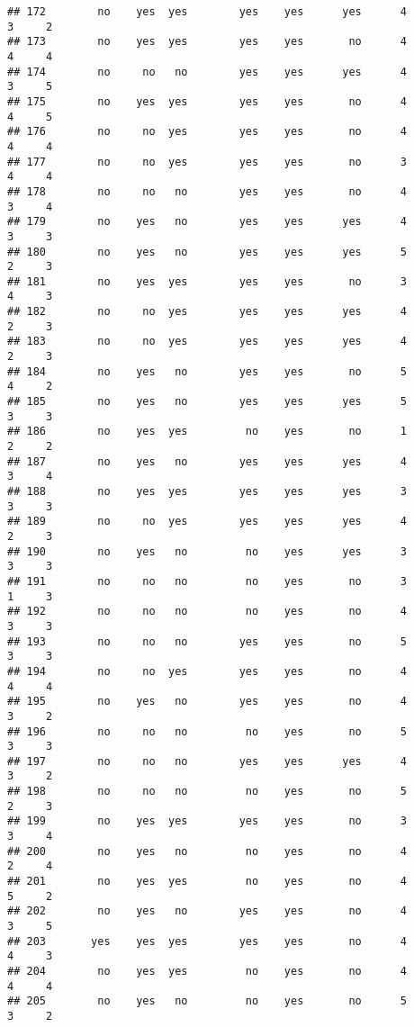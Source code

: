 \documentclass[]{article}
\begin{document}
\begin{verbatim}
## 172        no    yes  yes        yes    yes      yes      4        3     2
## 173        no    yes  yes        yes    yes       no      4        4     4
## 174        no     no   no        yes    yes      yes      4        3     5
## 175        no    yes  yes        yes    yes       no      4        4     5
## 176        no     no  yes        yes    yes       no      4        4     4
## 177        no     no  yes        yes    yes       no      3        4     4
## 178        no     no   no        yes    yes       no      4        3     4
## 179        no    yes   no        yes    yes      yes      4        3     3
## 180        no    yes   no        yes    yes      yes      5        2     3
## 181        no    yes  yes        yes    yes       no      3        4     3
## 182        no     no  yes        yes    yes      yes      4        2     3
## 183        no     no  yes        yes    yes      yes      4        2     3
## 184        no    yes   no        yes    yes       no      5        4     2
## 185        no    yes   no        yes    yes      yes      5        3     3
## 186        no    yes  yes         no    yes       no      1        2     2
## 187        no    yes   no        yes    yes      yes      4        3     4
## 188        no    yes  yes        yes    yes      yes      3        3     3
## 189        no     no  yes        yes    yes      yes      4        2     3
## 190        no    yes   no         no    yes      yes      3        3     3
## 191        no     no   no         no    yes       no      3        1     3
## 192        no     no   no         no    yes       no      4        3     3
## 193        no     no   no        yes    yes       no      5        3     3
## 194        no     no  yes        yes    yes       no      4        4     4
## 195        no    yes   no        yes    yes       no      4        3     2
## 196        no     no   no         no    yes       no      5        3     3
## 197        no     no   no        yes    yes      yes      4        3     2
## 198        no     no   no         no    yes       no      5        2     3
## 199        no    yes  yes        yes    yes       no      3        3     4
## 200        no    yes   no         no    yes       no      4        2     4
## 201        no    yes  yes         no    yes       no      4        5     2
## 202        no    yes   no        yes    yes       no      4        3     5
## 203       yes    yes  yes        yes    yes       no      4        4     3
## 204        no    yes  yes         no    yes       no      4        4     4
## 205        no    yes   no         no    yes       no      5        3     2

\end{verbatim}
\end{document}
